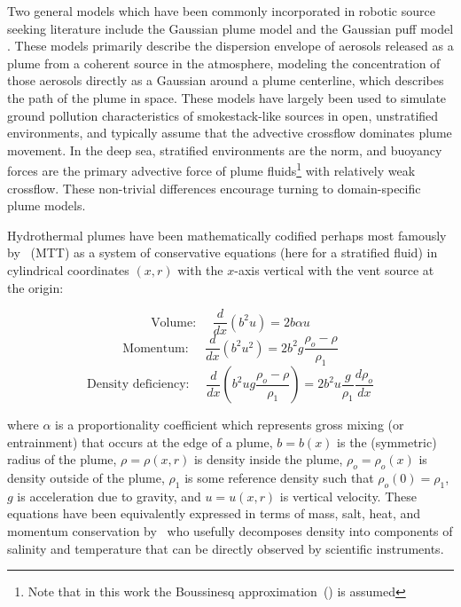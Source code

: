 Two general models which have been commonly incorporated in robotic source seeking literature include the Gaussian plume model \autocite{green1980analytic} and the Gaussian puff model \autocite{ludwig1977simplification}. These models primarily describe the dispersion envelope of aerosols released as a plume from a coherent source in the atmosphere, modeling the concentration of those aerosols directly as a Gaussian around a plume centerline, which describes the path of the plume in space. These models have largely been used to simulate ground pollution characteristics of smokestack-like sources in open, unstratified environments, and typically assume that the advective crossflow dominates plume movement. In the deep sea, stratified environments are the norm, and buoyancy forces are the primary advective force of plume fluids\footnote{Note that in this work the Boussinesq approximation~(\cite{van2010universal}) is assumed} with relatively weak crossflow. These non-trivial differences encourage turning to domain-specific plume models.

Hydrothermal plumes have been mathematically codified perhaps most famously by~\cite{morton1956turbulent} (MTT) as a system of conservative equations (here for a stratified fluid) in cylindrical coordinates $(x, r)$ with the $x$-axis vertical with the vent source at the origin:

\begin{equation}
    \text{Volume: } \quad \frac{d}{dx}(b^2 u) = 2 b \alpha u
\end{equation}
\begin{equation}
    \text{Momentum: } \quad \frac{d}{dx}(b^2 u^2) = 2 b^2 g\frac{\rho_o - \rho}{\rho_1} 
\end{equation}
\begin{equation}
    \text{Density deficiency: } \quad \frac{d}{dx}(b^2 u g \frac{\rho_o - \rho}{\rho_1}) = 2 b^2 u \frac{g}{\rho_1}\frac{d\rho_o}{dx}
\end{equation}

\noindent where $\alpha$ is a proportionality coefficient which represents gross mixing (or entrainment) that occurs at the edge of a plume, $b = b(x)$ is the (symmetric) radius of the plume, $\rho = \rho(x, r)$ is density inside the plume, $\rho_o=\rho_o(x)$ is density outside of the plume, $\rho_1$ is some reference density such that $\rho_o(0) = \rho_1$, $g$ is acceleration due to gravity, and $u = u(x,r)$ is vertical velocity. These equations have been equivalently expressed in terms of mass, salt, heat, and momentum conservation by~\cite{speer1989model} who usefully decomposes density into components of salinity and temperature that can be directly observed by scientific instruments.

